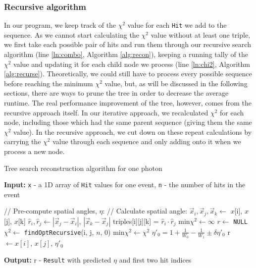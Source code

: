 \subsubsection{Recursive algorithm}
In our program, we keep track of the $\chi^2$ value for each \texttt{Hit} we add to the sequence. As we cannot start calculating the $\chi^2$ value without at least one triple, we first take each possible pair of hits and run them through our recursive search algorithm (line \ref{ln:combo}, Algorithm \ref{alg:recon}), keeping a running tally of the $\chi^2$ value and updating it for each child node we process (line \ref{ln:chi2}, Algorithm \ref{alg:recurse}). Theoretically, we could still have to process every possible sequence before reaching the minimum $\chi^2$ value, but, as will be discussed in the following sections, there are ways to prune the tree in order to decrease the average runtime. The real performance improvement of the tree, however, comes from the recursive approach itself. In our iterative approach, we recalculated $\chi^2$ for each node, including those which had the same parent sequence (giving them the same $\chi^2$ value). In the recursive approach, we cut down on these repeat calculations by carrying the $\chi^2$ value through each sequence and only adding onto it when we process a new node. 

\begin{algorithm}
\caption{Tree search reconstruction algorithm for one photon}\label{alg:recon}
\hspace{\algorithmicindent} \textbf{Input:} \texttt{x} - a 1D array of \texttt{Hit} values for one event, \texttt{n} - the number of hits in the event
\begin{algorithmic}[1]
    \State // Pre-compute spatial angles, $\eta$:
     \label{ln:precompute} 
        \State // Calculate spatial angle:
        \State $\vec{x}_{i}, \vec{x}_j, \vec{x}_{k} \gets$ $x$[i], $x$[j], $x$[k] 
        \State $\hat{r}_i, \hat{r}_j \gets |\vec{x}_j - \vec{x}_i|$, $|\vec{x}_k-\vec{x}_j|$ 
        \State triples[i][j][k] = $\hat{r}_i\cdot\hat{r}_j$ 
    \EndFor
    \State
    \State min$\chi^2 \gets \infty$
    \State $r \gets$ \texttt{NULL} 
    \State
     \label{ln:combo} 
        \State $\chi^2 \gets$ \texttt{findOptRecursive}(i, j, $n$, 0) 
        \State
         
        \State min$\chi^2 \gets \chi^2$
        \State $\eta'_0 = 1 + \frac{1}{W_0}-\frac{1}{W_1} \pm \delta\eta'_0$ 
        \State r $\gets x[i]$, $x[j]$, $\eta'_0$ 
        \EndIf
    \EndFor
\end{algorithmic}
\hspace{\algorithmicindent} \textbf{Output:} r - \texttt{Result} with predicted $\eta$ and first two hit indices
\end{algorithm}

